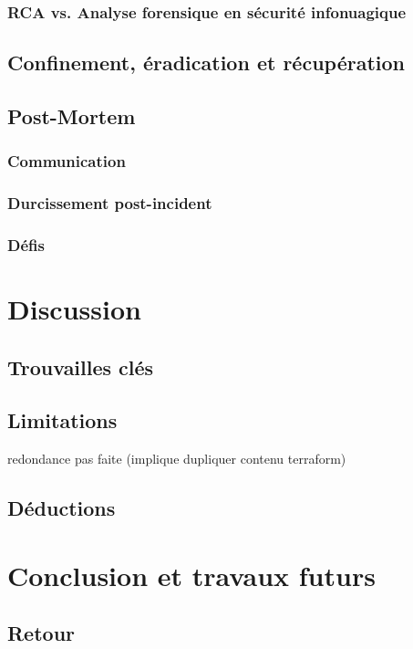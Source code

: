 \documentclass[conference]{IEEEtran}
\begin{document}
\subsubsection{RCA vs. Analyse forensique en sécurité infonuagique}
\subsection{Confinement, éradication et récupération}

\subsection{Post-Mortem}
\subsubsection{Communication}
\subsubsection{Durcissement post-incident}
\subsubsection{Défis}

\section{Discussion}

\subsection{Trouvailles clés}

\subsection{Limitations}
redondance pas faite (implique dupliquer contenu terraform)
\subsection{Déductions}

\section{Conclusion et travaux futurs}

\subsection{Retour}
\end{document}
